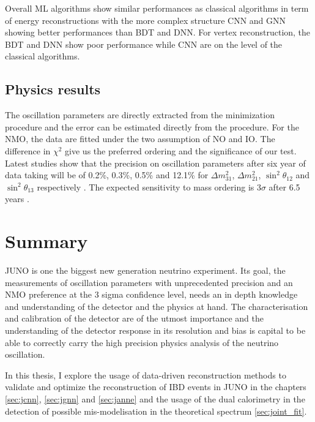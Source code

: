 \documentclass[../main.tex]{subfiles}
\begin{document}
Overall ML algorithms show similar performances as classical algorithms in term of energy reconstructions with the more complex structure CNN and GNN showing better performances than BDT and DNN. For vertex reconstruction, the BDT and DNN show poor performance while CNN are on the level of the classical algorithms.

\subsection{Physics results}

The oscillation parameters are directly extracted from the minimization procedure and the error can be estimated directly from the procedure. For the NMO, the data are fitted under the two assumption of NO and IO. The difference in $\chi^2$ give us the preferred ordering and the significance of our test. Latest studies show that the precision on oscillation parameters after six year of data taking will be of 0.2\%, 0.3\%, 0.5\% and 12.1\% for $\Delta m^2_{31}$, $\Delta m^2_{21}$, $\sin^2\theta_{12}$ and $\sin^2\theta_{13}$ respectively \cite{juno_collaboration_sub-percent_2022}. The expected sensitivity to mass ordering is $3\sigma$ after 6.5 years \cite{juno_collaboration_juno_2022}.

\section{Summary}

JUNO is one the biggest new generation neutrino experiment. Its goal, the measurements of oscillation parameters with unprecedented precision and an NMO preference at the 3 sigma confidence level, needs an in depth knowledge and understanding of the detector and the physics at hand. The characterisation and calibration of the detector are of the utmost importance and the understanding of the detector response in its resolution and bias is capital to be able to correctly carry the high precision physics analysis of the neutrino oscillation.

In this thesis, I explore the usage of data-driven reconstruction methods to validate and optimize the reconstruction of IBD events in JUNO in the chapters \ref{sec:jcnn}, \ref{sec:jgnn} and \ref{sec:janne} and the usage of the dual calorimetry in the detection of possible mis-modelisation in the theoretical spectrum \ref{sec:joint_fit}.
\end{document}
